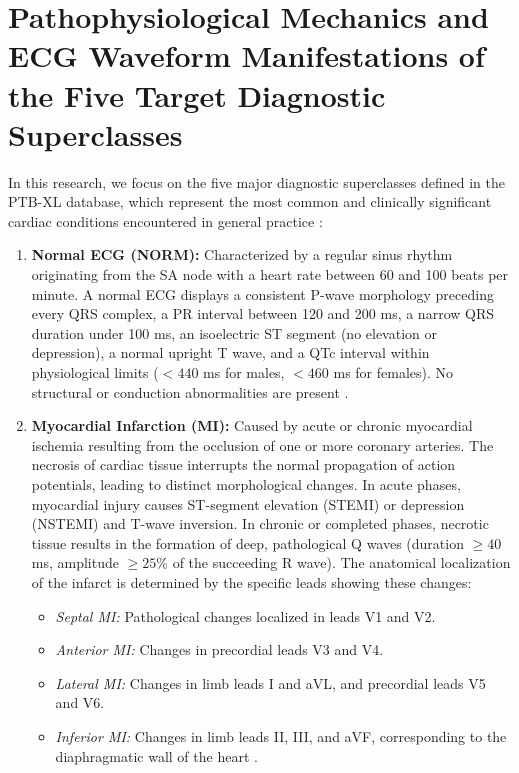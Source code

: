 \documentclass[12pt,a4paper]{report}
\begin{document}
\section{Pathophysiological Mechanics and ECG Waveform Manifestations of the Five Target Diagnostic Superclasses}
In this research, we focus on the five major diagnostic superclasses defined in the PTB-XL database, which represent the most common and clinically significant cardiac conditions encountered in general practice \cite{wagner2020ptbxl, strodthoff2021deep}:
\begin{enumerate}
    \item \textbf{Normal ECG (NORM):} Characterized by a regular sinus rhythm originating from the SA node with a heart rate between 60 and 100 beats per minute. A normal ECG displays a consistent P-wave morphology preceding every QRS complex, a PR interval between 120 and 200 ms, a narrow QRS duration under 100 ms, an isoelectric ST segment (no elevation or depression), a normal upright T wave, and a QTc interval within physiological limits ($<440$ ms for males, $<460$ ms for females). No structural or conduction abnormalities are present \cite{schlapfer2017ecg}.
    \item \textbf{Myocardial Infarction (MI):} Caused by acute or chronic myocardial ischemia resulting from the occlusion of one or more coronary arteries. The necrosis of cardiac tissue interrupts the normal propagation of action potentials, leading to distinct morphological changes. In acute phases, myocardial injury causes ST-segment elevation (STEMI) or depression (NSTEMI) and T-wave inversion. In chronic or completed phases, necrotic tissue results in the formation of deep, pathological Q waves (duration $\ge 40$ ms, amplitude $\ge 25\%$ of the succeeding R wave). The anatomical localization of the infarct is determined by the specific leads showing these changes:
    \begin{itemize}
        \item \emph{Septal MI:} Pathological changes localized in leads V1 and V2.
        \item \emph{Anterior MI:} Changes in precordial leads V3 and V4.
        \item \emph{Lateral MI:} Changes in limb leads I and aVL, and precordial leads V5 and V6.
        \item \emph{Inferior MI:} Changes in limb leads II, III, and aVF, corresponding to the diaphragmatic wall of the heart \cite{schlapfer2017ecg, ribeiro2020automatic}.
    \end{itemize}

\end{enumerate}
\end{document}
